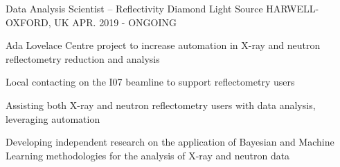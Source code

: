 \begin{cventries}
  \cventry
    {Data Analysis Scientist -- Reflectivity}
    {Diamond Light Source}
    {HARWELL-OXFORD, UK}
    {APR. 2019 - ONGOING}
    {
      \begin{cvitems}
        \item {Ada Lovelace Centre project to increase automation in X-ray and neutron reflectometry reduction and analysis}
        \item {Local contacting on the I07 beamline to support reflectometry users}
        \item {Assisting both X-ray and neutron reflectometry users with data analysis, leveraging automation}
        \item {Developing independent research on the application of Bayesian and Machine Learning methodologies for the analysis of X-ray and neutron data}
      \end{cvitems}
    }
\end{cventries}
